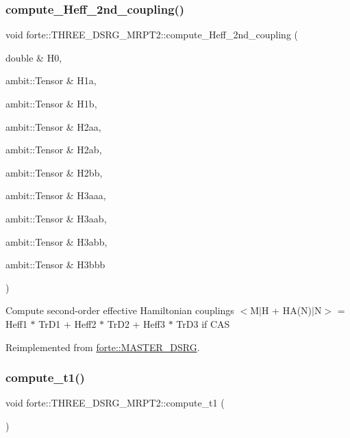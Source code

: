 \subsubsection{\texorpdfstring{compute\+\_\+\+Heff\+\_\+2nd\+\_\+coupling()}{compute\_Heff\_2nd\_coupling()}}
{\footnotesize\ttfamily void forte\+::\+T\+H\+R\+E\+E\+\_\+\+D\+S\+R\+G\+\_\+\+M\+R\+P\+T2\+::compute\+\_\+\+Heff\+\_\+2nd\+\_\+coupling (\begin{DoxyParamCaption}\item[{double \&}]{H0,  }\item[{ambit\+::\+Tensor \&}]{H1a,  }\item[{ambit\+::\+Tensor \&}]{H1b,  }\item[{ambit\+::\+Tensor \&}]{H2aa,  }\item[{ambit\+::\+Tensor \&}]{H2ab,  }\item[{ambit\+::\+Tensor \&}]{H2bb,  }\item[{ambit\+::\+Tensor \&}]{H3aaa,  }\item[{ambit\+::\+Tensor \&}]{H3aab,  }\item[{ambit\+::\+Tensor \&}]{H3abb,  }\item[{ambit\+::\+Tensor \&}]{H3bbb }\end{DoxyParamCaption})\hspace{0.3cm}{\ttfamily [virtual]}}

Compute second-\/order effective Hamiltonian couplings $<$M$\vert$H + H\+A(\+N)$\vert$N$>$ = Heff1 $\ast$ Tr\+D1 + Heff2 $\ast$ Tr\+D2 + Heff3 $\ast$ Tr\+D3 if C\+AS 

Reimplemented from \mbox{\hyperlink{classforte_1_1_m_a_s_t_e_r___d_s_r_g_ae4f6a58d88aa03439d4c12e56fe90e0b}{forte\+::\+M\+A\+S\+T\+E\+R\+\_\+\+D\+S\+RG}}.

\mbox{\label{classforte_1_1_t_h_r_e_e___d_s_r_g___m_r_p_t2_ad86db75d7db516ac82c7286d88bd38e0}} 
\subsubsection{\texorpdfstring{compute\+\_\+t1()}{compute\_t1()}}
{\footnotesize\ttfamily void forte\+::\+T\+H\+R\+E\+E\+\_\+\+D\+S\+R\+G\+\_\+\+M\+R\+P\+T2\+::compute\+\_\+t1 (\begin{DoxyParamCaption}{ }\end{DoxyParamCaption})\hspace{0.3cm}{\ttfamily [protected]}}

